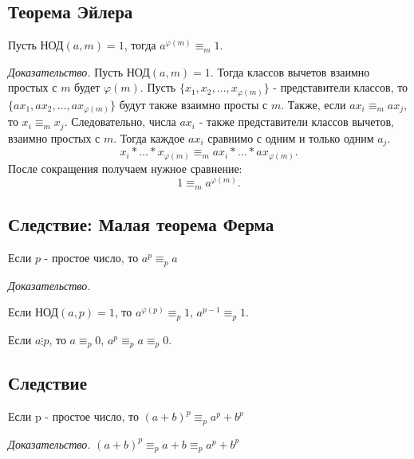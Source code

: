 \documentclass[12pt]{article}
\begin{document}
\subsection{Теорема Эйлера}
Пусть НОД$(a,m)=1$, тогда $a^{\varphi(m)}\equiv_{m}1.$
\par \textit{Доказательство.} Пусть НОД$(a,m)=1.$ Тогда классов вычетов взаимно простых с $m$ будет $\varphi(m)$. Пусть $\{x_{1},x_{2},\dots,x_{\varphi(m)}\}$ - представители классов, то $\{ax_{1},ax_{2},\dots,ax_{\varphi(m)}\}$ будут также взаимно просты с $m$. Также, если $ax_{i}\equiv_{m} ax_{j}$, то $x_{i}\equiv_{m} x_{j}.$ Следовательно, числа $ax_{i}$ - также представители классов вычетов, взаимно простых с $m$. Тогда каждое $ax_{i}$ сравнимо с одним и только одним $a_{j}$. \[x_{i}*\dots*x_{\varphi(m)}\equiv_{m} ax_{i}*\dots*ax_{\varphi(m)}.\] После сокращения получаем нужное сравнение: \[1\equiv_{m} a^{\varphi(m)}.\]

\subsection{Следствие: Малая теорема Ферма}
Если $p$ - простое число, то $a^{p}\equiv_{p}a$
\par \textit{Доказательство.}
\par Если НОД$(a,p)=1$, то $a^{\varphi(p)}\equiv_{p}1$, $a^{p-1}\equiv_{p}1$.
\par Если $a\vdots p$, то $a\equiv_{p}0$, $a^{p}\equiv_{p}a\equiv_{p}0$.

\subsection{Следствие}
Если p - простое число, то $(a+b)^{p}\equiv_{p}a^{p}+b^{p}$
\par \textit{Доказательство.} $(a+b)^{p}\equiv_{p}a+b\equiv_{p}a^{p}+b^{p}$
\end{document}
